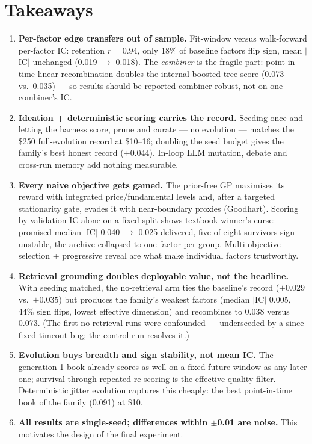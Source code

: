 \documentclass[11pt,a4paper]{article}
\begin{document}
\section*{Takeaways}
\begin{enumerate}
\item \textbf{Per-factor edge transfers out of sample.} Fit-window versus
walk-forward per-factor IC: retention $r=0.94$, only 18\% of baseline
factors flip sign, mean $|$IC$|$ unchanged (0.019 $\to$ 0.018). The
\emph{combiner} is the fragile part: point-in-time linear recombination
doubles the internal boosted-tree score (0.073 vs.\ 0.035) --- so results
should be reported combiner-robust, not on one combiner's IC.
\item \textbf{Ideation + deterministic scoring carries the record.} Seeding
once and letting the harness score, prune and curate --- no evolution ---
matches the \$250 full-evolution record at \$10--16; doubling the seed
budget gives the family's best honest record ($+0.044$). In-loop LLM
mutation, debate and cross-run memory add nothing measurable.
\item \textbf{Every naive objective gets gamed.} The prior-free GP maximises
its reward with integrated price/fundamental levels and, after a targeted
stationarity gate, evades it with near-boundary proxies (Goodhart). Scoring
by validation IC alone on a fixed split shows textbook winner's curse:
promised median $|$IC$|$ 0.040 $\to$ 0.025 delivered, five of eight
survivors sign-unstable, the archive collapsed to one factor per group.
Multi-objective selection + progressive reveal are what make individual
factors trustworthy.
\item \textbf{Retrieval grounding doubles deployable value, not the
headline.} With seeding matched, the no-retrieval arm ties the baseline's
record ($+0.029$ vs.\ $+0.035$) but produces the family's weakest factors
(median $|$IC$|$ 0.005, 44\% sign flips, lowest effective dimension) and
recombines to 0.038 versus 0.073. (The first no-retrieval runs were
confounded --- underseeded by a since-fixed timeout bug; the control run
resolves it.)
\item \textbf{Evolution buys breadth and sign stability, not mean IC.} The
generation-1 book already scores as well on a fixed future window as any
later one; survival through repeated re-scoring is the effective quality
filter. Deterministic jitter evolution captures this cheaply: the best
point-in-time book of the family (0.091) at \$10.
\item \textbf{All results are single-seed; differences within $\pm$0.01 are
noise.} This motivates the design of the final experiment.
\end{enumerate}
\end{document}
